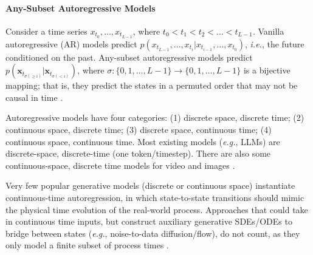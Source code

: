 \documentclass{article}
\begin{document}
\paragraph{Any-Subset Autoregressive Models}
Consider a time series $x_{t_0}, \ldots, x_{t_{L-1}}$, where $t_0 < t_1 < t_2 < \ldots < t_{L-1}$. Vanilla autoregressive (AR) models predict $p(x_{t_{L-1}}, \ldots, x_{t_i} | x_{t_{i-1}}, \ldots, x_{t_0})$, \textit{i.e.}, the future conditioned on the past. Any-subset autoregressive models predict $p(\mathbf{x}_{t_{\sigma(\geq i)}} | \mathbf{x}_{t_{\sigma(< i)}})$, where $\sigma: \{0, 1, \ldots, L-1\} \rightarrow \{0, 1, \ldots, L-1\}$ is a bijective mapping; that is, they predict the states in a permuted order that may not be causal in time \cite{guo2025reviving}.

Autoregressive models have four categories: (1) discrete space, discrete time; (2) continuous space, discrete time; (3) discrete space, continuous time; (4) continuous space, continuous time. Most existing models (\textit{e.g.}, LLMs) are discrete-space, discrete-time (one token/timestep). There are also some continuous-space, discrete time models for video \cite{ho2022video, chen2024probabilistic, zhang2025frame, zhang2025pretraining} and images \cite{li2024autoregressive}.

Very few popular generative models (discrete or continuous space) instantiate continuous-time autoregression, in which state-to-state transitions should mimic the physical time evolution of the real-world process. Approaches that could take in continuous time inputs, but construct auxiliary generative SDEs/ODEs to bridge between states (\textit{e.g.}, noise-to-data diffusion/flow), do not count, as they only model a finite subset of process times \cite{chen2024probabilistic}.
\end{document}
